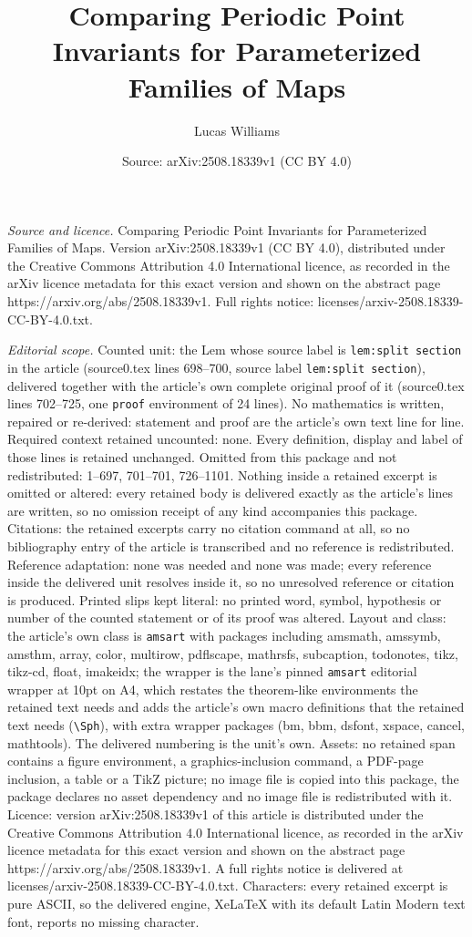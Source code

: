 \documentclass[10pt,a4paper]{amsart}
\title[Comparing Periodic Point Invariants for Parameterized Famili]{Comparing Periodic Point Invariants for Parameterized Families of Maps}
\author{Lucas Williams}
\date{Source: arXiv:2508.18339v1 (CC BY 4.0)}
\begin{document}
\maketitle

\noindent\emph{Source and licence.} Comparing Periodic Point Invariants for Parameterized Families of Maps. Version arXiv:2508.18339v1 (CC BY 4.0), distributed under the Creative Commons Attribution 4.0 International licence, as recorded in the arXiv licence metadata for this exact version and shown on the abstract page https://arxiv.org/abs/2508.18339v1. Full rights notice: licenses/arxiv-2508.18339-CC-BY-4.0.txt.\par\smallskip

\noindent\textit{Editorial scope.} Counted unit: the Lem whose source label is \texttt{lem:split section} in the article (source0.tex lines 698--700, source label \texttt{lem:split section}), delivered together with the article's own complete original proof of it (source0.tex lines 702--725, one \texttt{proof} environment of 24 lines). No mathematics is written, repaired or re-derived: statement and proof are the article's own text line for line. Required context retained uncounted: none. Every definition, display and label of those lines is retained unchanged. Omitted from this package and not redistributed: 1--697, 701--701, 726--1101. Nothing inside a retained excerpt is omitted or altered: every retained body is delivered exactly as the article's lines are written, so no omission receipt of any kind accompanies this package. Citations: the retained excerpts carry no citation command at all, so no bibliography entry of the article is transcribed and no reference is redistributed. Reference adaptation: none was needed and none was made; every reference inside the delivered unit resolves inside it, so no unresolved reference or citation is produced. Printed slips kept literal: no printed word, symbol, hypothesis or number of the counted statement or of its proof was altered. Layout and class: the article's own class is \texttt{amsart} with packages including amsmath, amssymb, amsthm, array, color, multirow, pdflscape, mathrsfs, subcaption, todonotes, tikz, tikz-cd, float, imakeidx; the wrapper is the lane's pinned \texttt{amsart} editorial wrapper at 10pt on A4, which restates the theorem-like environments the retained text needs and adds the article's own macro definitions that the retained text needs (\texttt{\textbackslash Sph}), with extra wrapper packages (bm, bbm, dsfont, xspace, cancel, mathtools). The delivered numbering is the unit's own. Assets: no retained span contains a figure environment, a graphics-inclusion command, a PDF-page inclusion, a table or a TikZ picture; no image file is copied into this package, the package declares no asset dependency and no image file is redistributed with it. Licence: version arXiv:2508.18339v1 of this article is distributed under the Creative Commons Attribution 4.0 International licence, as recorded in the arXiv licence metadata for this exact version and shown on the abstract page https://arxiv.org/abs/2508.18339v1. A full rights notice is delivered at licenses/arxiv-2508.18339-CC-BY-4.0.txt. Characters: every retained excerpt is pure ASCII, so the delivered engine, XeLaTeX with its default Latin Modern text font, reports no missing character.
\end{document}
